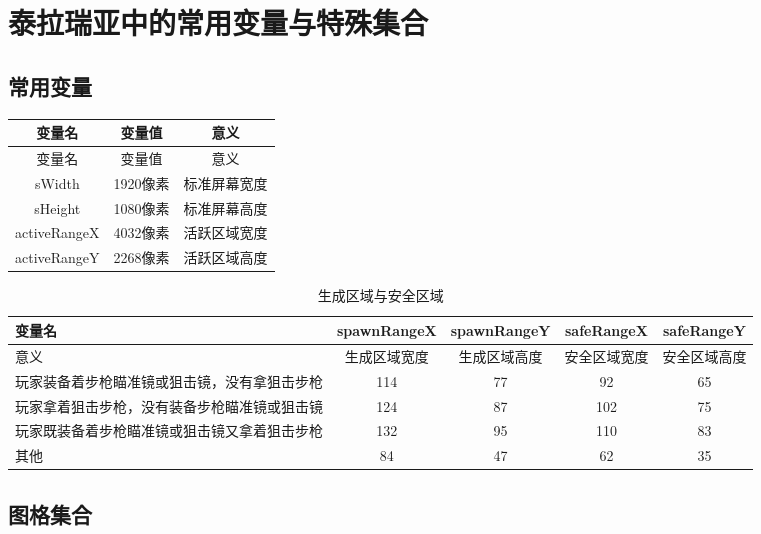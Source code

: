 \chapter{泰拉瑞亚中的常用变量与特殊集合}
\section{常用变量}
\begin{longtable}{ccc}
变量名&变量值&意义\\\hline
\endfirsthead
变量名&变量值&意义\\\hline
\endhead
\hline
\endfoot
sWidth&1920像素&标准屏幕宽度\\\hline
sHeight&1080像素&标准屏幕高度\\\hline
activeRangeX&4032像素&活跃区域宽度\\\hline
activeRangeY&2268像素&活跃区域高度
\end{longtable}

\begin{table}[!h]
    \centering
    \begin{tabular}{|p{}<{\centering}|c|c|c|c|}
         \hline 变量名&spawnRangeX&spawnRangeY&safeRangeX&safeRangeY  \\\hline
         意义&生成区域宽度&生成区域高度&安全区域宽度&安全区域高度\\\hline
         玩家装备着步枪瞄准镜或狙击镜，没有拿狙击步枪&114&77&92&65\\\hline
         玩家拿着狙击步枪，没有装备步枪瞄准镜或狙击镜&124&87&102&75\\\hline
         玩家既装备着步枪瞄准镜或狙击镜又拿着狙击步枪&132&95&110&83\\\hline
         其他&84&47&62&35\\\hline
    \end{tabular}
    \caption{生成区域与安全区域}
    \label{tab4618}
\end{table}

\section{图格集合}
